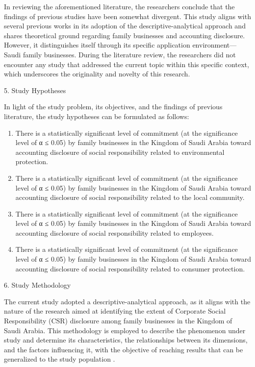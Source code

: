 \documentclass{default}
\begin{document}
In reviewing the aforementioned literature, the researchers conclude that the findings of previous studies have been somewhat divergent. This study aligns with several previous works in its adoption of the descriptive-analytical approach and shares theoretical ground regarding family businesses and accounting disclosure. However, it distinguishes itself through its specific application environment—Saudi family businesses. During the literature review, the researchers did not encounter any study that addressed the current topic within this specific context, which underscores the originality and novelty of this research.

5. Study Hypotheses

In light of the study problem, its objectives, and the findings of previous literature, the study hypotheses can be formulated as follows:

\begin{enumerate}
  \item There is a statistically significant level of commitment (at the significance level of α ≤ 0.05) by family businesses in the Kingdom of Saudi Arabia toward accounting disclosure of social responsibility related to environmental protection.
  \item There is a statistically significant level of commitment (at the significance level of α ≤ 0.05) by family businesses in the Kingdom of Saudi Arabia toward accounting disclosure of social responsibility related to the local community.
  \item There is a statistically significant level of commitment (at the significance level of α ≤ 0.05) by family businesses in the Kingdom of Saudi Arabia toward accounting disclosure of social responsibility related to employees.
  \item There is a statistically significant level of commitment (at the significance level of α ≤ 0.05) by family businesses in the Kingdom of Saudi Arabia toward accounting disclosure of social responsibility related to consumer protection.
\end{enumerate}

6. Study Methodology

The current study adopted a descriptive-analytical approach, as it aligns with the nature of the research aimed at identifying the extent of Corporate Social Responsibility (CSR) disclosure among family businesses in the Kingdom of Saudi Arabia. This methodology is employed to describe the phenomenon under study and determine its characteristics, the relationships between its dimensions, and the factors influencing it, with the objective of reaching results that can be generalized to the study population \cite{ref32}.
\end{document}
